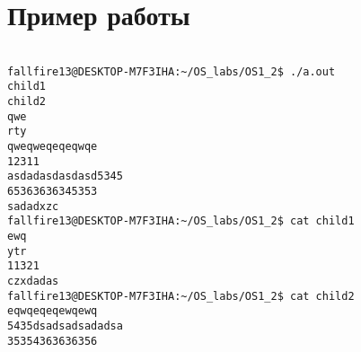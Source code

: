 \section{Пример работы}

\begin{verbatim}

fallfire13@DESKTOP-M7F3IHA:~/OS_labs/OS1_2$ ./a.out
child1
child2
qwe
rty
qweqweqeqeqwqe
12311
asdadasdasdasd5345
65363636345353
sadadxzc
fallfire13@DESKTOP-M7F3IHA:~/OS_labs/OS1_2$ cat child1
ewq
ytr
11321
czxdadas
fallfire13@DESKTOP-M7F3IHA:~/OS_labs/OS1_2$ cat child2
eqwqeqeqewqewq
5435dsadsadsadadsa
35354363636356

\end{verbatim}

\pagebreak


